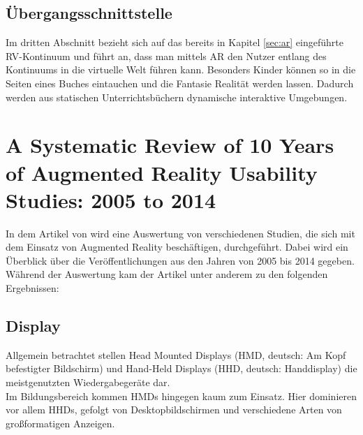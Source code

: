 \subsection{Übergangsschnittstelle}
Im dritten Abschnitt bezieht sich \citeauthor{billinghurst:ar-in-education} auf das bereits in Kapitel \ref{sec:ar} eingeführte RV-Kontinuum und führt an, dass man mittels AR den Nutzer entlang des Kontinuums in die virtuelle Welt führen kann. Besonders Kinder können so in die Seiten eines Buches eintauchen und die Fantasie Realität werden lassen. Dadurch werden aus statischen Unterrichtsbüchern dynamische interaktive Umgebungen.


\section{A Systematic Review of 10 Years of Augmented Reality Usability Studies: 2005 to 2014}
In dem Artikel \citep{dey:review-of-ar-studies} von \citeauthor{dey:review-of-ar-studies} wird eine Auswertung von verschiedenen Studien, die sich mit dem Einsatz von Augmented Reality beschäftigen, durchgeführt. Dabei wird ein Überblick über die Veröffentlichungen aus den Jahren von 2005 bis 2014 gegeben.\\
Während der Auswertung kam der Artikel unter anderem zu den folgenden Ergebnissen:

\subsection{Display}
Allgemein betrachtet stellen Head Mounted Displays (HMD, deutsch: \glqq Am Kopf befestigter Bildschirm\grqq ) und Hand-Held Displays (HHD, deutsch: \glqq Handdisplay\grqq ) die meistgenutzten Wiedergabegeräte dar.\\
Im Bildungsbereich kommen HMDs hingegen kaum zum Einsatz. Hier dominieren vor allem HHDs, gefolgt von Desktopbildschirmen und  verschiedene Arten von großformatigen Anzeigen.

